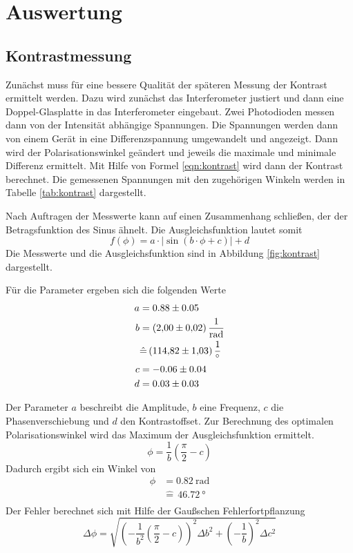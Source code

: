 \section{Auswertung}
\subsection{Kontrastmessung}
Zunächst muss für eine bessere Qualität der späteren Messung der Kontrast
ermittelt werden. Dazu wird zunächst das Interferometer justiert und dann eine
Doppel-Glasplatte in das Interferometer eingebaut. Zwei Photodioden messen dann
 von der Intensität abhängige Spannungen. Die Spannungen werden dann von einem
Gerät in eine Differenzspannung umgewandelt und angezeigt. Dann wird der
Polarisationswinkel geändert und jeweils die maximale und minimale Differenz
ermittelt. Mit Hilfe von Formel \eqref{eqn:kontrast} wird dann der Kontrast
berechnet. Die gemessenen Spannungen mit den zugehörigen Winkeln werden in
Tabelle \ref{tab:kontrast} dargestellt.



Nach Auftragen der Messwerte kann auf einen Zusammenhang schließen, der der
Betragsfunktion des Sinus ähnelt. Die Ausgleichsfunktion lautet somit
\begin{equation}
  f(\phi) = a \cdot \lvert \sin(b \cdot \phi +c) \rvert +d
\end{equation}
Die Messwerte und die Ausgleichsfunktion sind in Abbildung \ref{fig:kontrast}
dargestellt.

Für die Parameter ergeben sich die folgenden Werte
\begin{align*}
  a &= 0.88 \pm 0.05 \\
  b &= \SI{2.00 \pm 0.02}{\per\radian} \\
    &\hat{=}\, \SI{114.82 \pm 1.03}{\per\degree} \\
  c &= -0.06 \pm 0.04 \\
  d &= 0.03 \pm 0.03 \\
\end{align*}

Der Parameter $a$ beschreibt die Amplitude, $b$ eine Frequenz, $c$ die
Phasenverschiebung und $d$ den Kontrastoffset.
Zur Berechnung des optimalen Polarisationswinkel wird das Maximum der
Ausgleichsfunktion ermittelt.
\begin{equation}
  \phi = \frac{1}{b} \left(\frac{\pi}{2} -c \right)
\end{equation}
Dadurch ergibt sich ein Winkel von
\begin{align*}
  \phi &= \SI{0.82}{\radian} \\
       &\hat{=} \, \SI{46.72}{\degree} \\
\end{align*}
Der Fehler berechnet sich mit Hilfe der Gaußschen Fehlerfortpflanzung
\begin{equation}
  \Delta \phi =\sqrt{\left(- \frac{1}{b^2} \left(\frac{\pi}{2} -c \right)  \right)^2
  \Delta b^2 + \left(- \frac{1}{b}\right)^2 \Delta c^2}
\end{equation}

